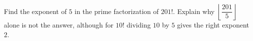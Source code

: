 Find the exponent of $5$ in the prime factorization of $201!$. Explain why $\left\lfloor\dfrac{201}{5}\right\rfloor$ alone is not the answer, although for $10!$ dividing $10$ by $5$ gives the right exponent $2$.
